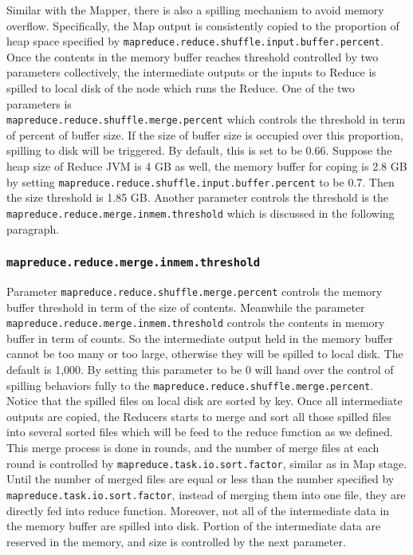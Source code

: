 Similar with the Mapper, there is also a spilling mechanism to avoid memory 
overflow. Specifically, the Map output is consistently copied to the proportion 
of heap space specified by \texttt{mapreduce.reduce.shuffle.input.buffer.percent}.
Once the contents in the memory buffer reaches threshold controlled by two 
parameters collectively, the intermediate outputs or the inputs to Reduce is 
spilled to local disk of the node which runs the Reduce. One of the two parameters 
is \\
\texttt{mapreduce.reduce.shuffle.merge.percent} which controls the threshold in 
term of percent of buffer size. If the size of buffer size is occupied over this
proportion, spilling to disk will be triggered. By default, this is set to be 
0.66. Suppose the heap size of Reduce JVM is 4 GB as well, the memory buffer for
coping is 2.8 GB by setting \texttt{mapreduce.reduce.shuffle.input.buffer.percent}
to be 0.7. Then the size threshold is 1.85 GB. Another parameter controls the
threshold is the \texttt{mapreduce.reduce.merge.inmem.threshold} which is discussed
in the following paragraph.

\subsubsection{\texttt{mapreduce.reduce.merge.inmem.threshold}}

Parameter \texttt{mapreduce.reduce.shuffle.merge.percent} controls the memory
buffer threshold in term of the size of contents. Meanwhile the parameter \\
\texttt{mapreduce.reduce.merge.inmem.threshold} controls the contents in memory
buffer in term of counts. So the intermediate output held in the memory buffer
cannot be too many or too large, otherwise they will be spilled to local disk.
The default is 1,000. By setting this parameter to be 0 will hand over the control
of spilling behaviors fully to the \texttt{mapreduce.reduce.shuffle.merge.percent}. 
Notice that the spilled files on local disk are sorted by key. Once all 
intermediate outputs are copied, the Reducers starts to merge and sort all those
spilled files into several sorted files which will be feed to the reduce function
as we defined. This merge process is done in rounds, and the number of merge files
at each round is controlled by \texttt{mapreduce.task.io.sort.factor}, similar 
as in Map stage. Until the number of merged files are equal or less than the number 
specified by \\ \texttt{mapreduce.task.io.sort.factor}, instead of merging them 
into one file, they are directly fed into reduce function. Moreover, not all
of the intermediate data in the memory buffer are spilled into disk. Portion of 
the intermediate data are reserved in the memory, and size is controlled by the
next parameter.

